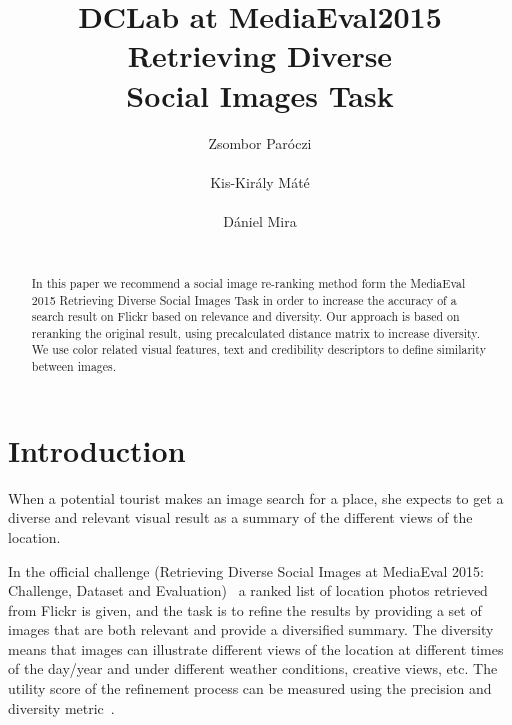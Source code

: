 \documentclass{sig-alternate}
\begin{document}

\title{DCLab at MediaEval2015 Retrieving Diverse \\ Social Images Task}


\author{
\alignauthor
Zsombor Par\'oczi\\
       \\
\alignauthor
Kis-Kir\'aly M\'at\'e \\
		\\
\alignauthor
D\'aniel Mira\\
		\\
}

\maketitle
\begin{abstract}
In this paper we recommend a social image re-ranking method form the MediaEval 2015 Retrieving Diverse Social Images Task in order to increase the accuracy of a search result on Flickr based on relevance and diversity. Our approach is based on reranking the original result, using precalculated distance matrix to increase diversity. We use color related visual features, text and credibility descriptors to define similarity between images.
\end{abstract}

\section{Introduction}

When a potential tourist makes an image search for a place, she expects to get a diverse and relevant visual result as a summary of the different views of the location. 

In the official challenge (Retrieving Diverse Social Images at MediaEval 2015: Challenge, Dataset and Evaluation)~\cite{Task2015} a ranked list of location photos retrieved from Flickr is given, and the task is to refine the results by providing a set of images that are both relevant and provide a diversified summary. The diversity means that images can illustrate different views of the location at different times of the day/year and under different weather conditions, creative views, etc. The utility score of the refinement process can be measured using the precision and diversity metric~\cite{Taneva:2010:GRP:1718487.1718541}. 
\end{document}
